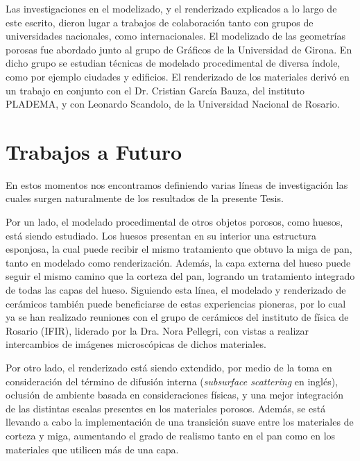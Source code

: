 Las investigaciones en el modelizado, y el renderizado explicados a lo largo de este escrito, dieron lugar a trabajos de colaboración tanto con grupos de universidades nacionales, como internacionales.
El modelizado de las geometrías porosas fue abordado junto al grupo de Gráficos de la Universidad de Girona.
En dicho grupo se estudian técnicas de modelado procedimental de diversa índole, como por ejemplo ciudades y edificios.
El renderizado de los materiales derivó en un trabajo en conjunto con el Dr. Cristian García Bauza, del instituto PLADEMA, y con Leonardo Scandolo, de la Universidad Nacional de Rosario.



\section{Trabajos a Futuro}
En estos momentos nos encontramos definiendo varias líneas de investigación las cuales surgen naturalmente de los resultados de la presente Tesis.

Por un lado, el modelado procedimental de otros objetos porosos, como huesos, está siendo estudiado.
Los huesos presentan en su interior una estructura esponjosa, la cual puede recibir el mismo tratamiento que obtuvo la miga de pan, tanto en modelado como renderización.
Además, la capa externa del hueso puede seguir el mismo camino que la corteza del pan, logrando un tratamiento integrado de todas las capas del hueso.
Siguiendo esta línea, el modelado y renderizado de cerámicos también puede beneficiarse de estas experiencias pioneras, por lo cual ya se han realizado reuniones con el grupo de cerámicos del instituto de física de Rosario (IFIR), liderado por la Dra. Nora Pellegri, con vistas a realizar intercambios de imágenes microscópicas de dichos materiales.

Por otro lado, el renderizado está siendo extendido, por medio de la toma en consideración del término de difusión interna ({\em subsurface scattering} en inglés), oclusión de ambiente basada en consideraciones físicas, y una mejor integración de las distintas escalas presentes en los materiales porosos.
Además, se está llevando a cabo la implementación de una transición suave entre los materiales de corteza y miga, aumentando el grado de realismo tanto en el pan como en los materiales que utilicen más de una capa.

